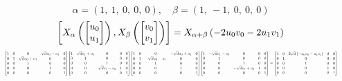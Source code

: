 \documentclass[11pt]{article}
\theoremstyle{definition}
\begin{document}
\[
\alpha = \left( 1, \  1, \  0, \  0, \  0\right), \quad \beta = \left( 1, \  -1, \  0, \  0, \  0\right)
\]
\[
\scaletoalign{\textwidth}{\left[ X_{\alpha}\left(\left[\begin{matrix}u_{0}\\u_{1}\end{matrix}\right]\right), X_{\beta}\left(\left[\begin{matrix}v_{0}\\v_{1}\end{matrix}\right]\right) \right] = X_{\alpha + \beta}\left(- 2 u_{0} v_{0} - 2 u_{1} v_{1}\right)}
\]
\[
\scaletoalign{\textwidth}{{\left[\begin{matrix}1 & 0 & 0 & \sqrt{d} u_{0} - u_{1} & 0\\0 & 1 & \sqrt{d} u_{0} + u_{1} & 0 & 0\\0 & 0 & 1 & 0 & 0\\0 & 0 & 0 & 1 & 0\\0 & 0 & 0 & 0 & 1\end{matrix}\right]} {\left[\begin{matrix}1 & \sqrt{d} v_{1} + v_{0} & 0 & 0 & 0\\0 & 1 & 0 & 0 & 0\\0 & 0 & 1 & 0 & 0\\0 & 0 & \sqrt{d} v_{1} - v_{0} & 1 & 0\\0 & 0 & 0 & 0 & 1\end{matrix}\right]} {\left[\begin{matrix}1 & 0 & 0 & - \sqrt{d} u_{0} + u_{1} & 0\\0 & 1 & - \sqrt{d} u_{0} - u_{1} & 0 & 0\\0 & 0 & 1 & 0 & 0\\0 & 0 & 0 & 1 & 0\\0 & 0 & 0 & 0 & 1\end{matrix}\right]} {\left[\begin{matrix}1 & - \sqrt{d} v_{1} - v_{0} & 0 & 0 & 0\\0 & 1 & 0 & 0 & 0\\0 & 0 & 1 & 0 & 0\\0 & 0 & - \sqrt{d} v_{1} + v_{0} & 1 & 0\\0 & 0 & 0 & 0 & 1\end{matrix}\right]} = {\left[\begin{matrix}1 & 0 & 2 \sqrt{d} \left(- u_{0} v_{0} - u_{1} v_{1}\right) & 0 & 0\\0 & 1 & 0 & 0 & 0\\0 & 0 & 1 & 0 & 0\\0 & 0 & 0 & 1 & 0\\0 & 0 & 0 & 0 & 1\end{matrix}\right]}}
\]
\end{document}
